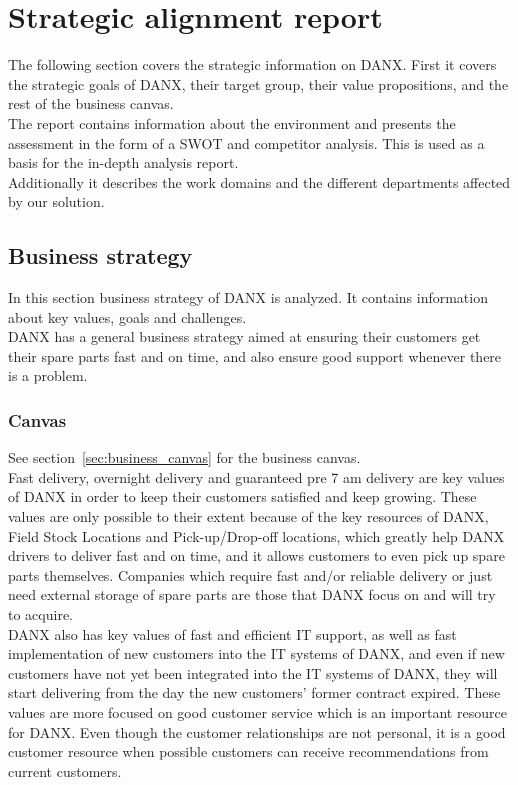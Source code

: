 \chapter{Strategic alignment report}
\label{chap:strategicalignmentreport}
The following section covers the strategic information on DANX. First it covers the strategic goals of DANX, their target group, their value propositions, and the rest of the business canvas.\\
The report contains information about the environment and presents the assessment in the form of a SWOT and competitor analysis. This is used as a basis for the in-depth analysis report.\\
Additionally it describes the work domains and the different departments affected by our solution.

\section{Business strategy}
In this section business strategy of DANX is analyzed. It contains information about key values, goals and challenges.\\
DANX has a general business strategy aimed at ensuring their customers get their spare parts fast and on time, and also ensure good support whenever there is a problem.\cite{gert027}\cite{gert025}\cite{lasse012}

\subsection{Canvas}
See section~\ref{sec:business_canvas} for the business canvas.\\
Fast delivery, overnight delivery and guaranteed pre 7 am\cite{gert001} delivery are key values of DANX in order to keep their customers satisfied and keep growing.\cite{mail}\cite{gert025}\cite{gert026} These values are only possible to their extent because of the key resources of DANX, Field Stock Locations and Pick-up/Drop-off locations, which greatly help DANX drivers to deliver fast and on time, and it allows customers to even pick up spare parts themselves. Companies which require fast and/or reliable delivery or just need external storage of spare parts are those that DANX focus on and will try to acquire.\\
DANX also has key values of fast and efficient IT support, as well as fast implementation of new customers into the IT systems of DANX, and even if new customers have not yet been integrated into the IT systems of DANX, they will start delivering from the day the new customers' former contract expired.\cite{lasse008} These values are more focused on good customer service which is an important resource for DANX. Even though the customer relationships are not personal, it is a good customer resource when possible customers can receive recommendations from current customers.\cite{bob002}

